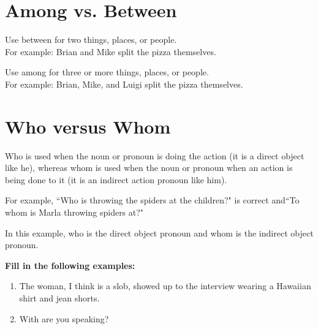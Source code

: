 \vfill
\section{Among vs. Between}
Use between for two things, places, or people.\\
For example: Brian and Mike split the pizza \longline themselves.

\bigskip
Use among for three or more things, places, or people.\\
For example:  Brian, Mike, and Luigi split the pizza \longline  themselves.

\vfill
\section{Who versus Whom}
Who is used when the noun or pronoun is doing the action (it is a direct object like he), whereas whom is used when the noun or pronoun when an action is being done to it (it is an indirect action pronoun like him).

\bigskip
For example, ``Who is throwing the spiders at the children?" is correct and``To whom is Marla throwing spiders at?"

\bigskip
In this example, who is the direct object pronoun and whom is the indirect object pronoun.

\bigskip
\textbf{Fill in the following examples:}

\begin{enumerate}
\item{The woman, \longline I think is a slob, showed up to the interview wearing a Hawaiian shirt and jean shorts. }
\item{With \longline are you speaking?}
\end{enumerate}